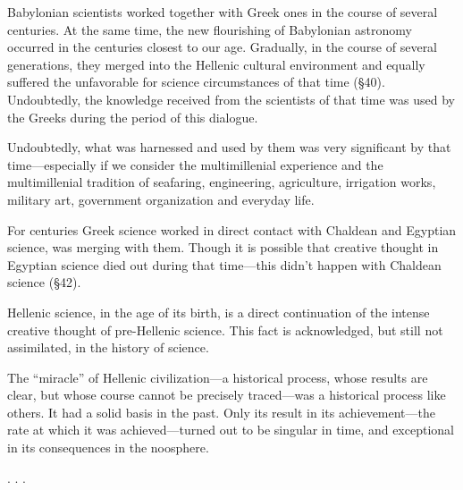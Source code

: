 Babylonian scientists worked together with Greek ones in the course of several
centuries.  At the same time, the new flourishing of Babylonian astronomy
occurred in the centuries closest to our age.  Gradually, in the course of
several generations, they merged into the Hellenic cultural environment and
equally suffered the unfavorable for science circumstances of that time (§40).
Undoubtedly, the knowledge received from the scientists of that time was used
by the Greeks during the period of this dialogue.

Undoubtedly, what was harnessed and used by them was very significant by that
time---especially if we consider the multimillenial experience and the
multimillenial tradition of seafaring, engineering, agriculture, irrigation
works, military art, government organization and everyday life.

For centuries Greek science worked in direct contact with Chaldean and Egyptian
science, was merging with them.  Though it is possible that creative thought in
Egyptian science died out during that time---this didn't happen with Chaldean
science (§42).

Hellenic science, in the age of its birth, is a direct continuation of the
intense creative thought of pre-Hellenic science.  This fact is acknowledged,
but still not assimilated, in the history of science.

The ``miracle'' of Hellenic civilization---a historical process, whose results
are clear, but whose course cannot be precisely traced---was a historical
process like others.  It had a solid basis in the past.  Only its result in its
achievement---the rate at which it was achieved---turned out to be singular in
time, and exceptional in its consequences in the noosphere.


\Section %

. . .
